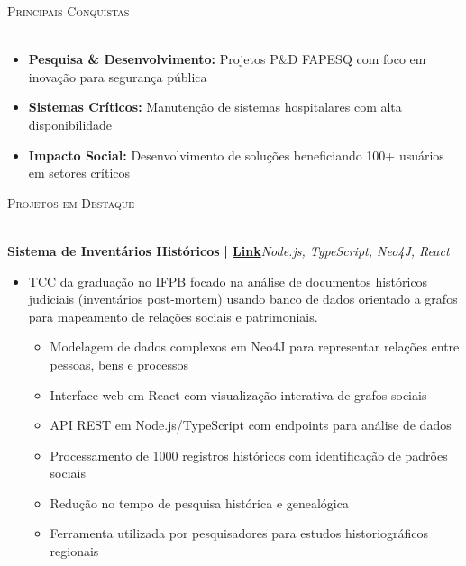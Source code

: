 \documentclass[a4paper]{article}
\newcommand{\lineunder}{
    \vspace*{-8pt} \\
    \hspace*{-18pt} \hrulefill \\
}
\newcommand{\header}[1]{
    {\hspace*{-18pt}\vspace*{6pt} \textsc{#1}}
    \vspace*{-6pt} \lineunder
}
\begin{document}
%
%
\header{Principais Conquistas}
\vspace{2mm}
\begin{itemize}[leftmargin=*]
    \item \textbf{Pesquisa \& Desenvolvimento:} Projetos P\&D FAPESQ com foco em inovação para segurança pública
    \item \textbf{Sistemas Críticos:} Manutenção de sistemas hospitalares com alta disponibilidade
    \item \textbf{Impacto Social:} Desenvolvimento de soluções beneficiando 100+ usuários em setores críticos
\end{itemize}
\vspace{2mm}

%
%
\header{Projetos em Destaque}
\vspace{1mm}

{\textbf{Sistema de Inventários Históricos}}\textbf{ | \href{https://repositorio.ifpb.edu.br/handle/177683/2898}{Link}}\hfill{\sl Node.js, TypeScript, Neo4J, React}\\
\vspace{-3mm}
\begin{itemize} \itemsep -3pt
    \item[] TCC da graduação no IFPB focado na análise de documentos históricos judiciais (inventários post-mortem) usando banco de dados orientado a grafos para mapeamento de relações sociais e patrimoniais.
        \begin{itemize}
            \item Modelagem de dados complexos em Neo4J para representar relações entre pessoas, bens e processos
            \item Interface web em React com visualização interativa de grafos sociais
            \item API REST em Node.js/TypeScript com endpoints para análise de dados
            \item Processamento de 1000 registros históricos com identificação de padrões sociais
            \item Redução no tempo de pesquisa histórica e genealógica
            \item Ferramenta utilizada por pesquisadores para estudos historiográficos regionais
        \end{itemize}
\end{itemize}
\vspace*{2mm}
\end{document}
